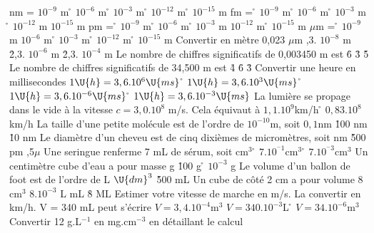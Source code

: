  nm =
\rv
$10^{-9}$ m
\r
$10^{-6}$ m
\r
$10^{-3}$ m
\r
$10^{-12}$ m
\r
$10^{-15}$ m
 fm =
\r
$10^{-9}$ m
\r
$10^{-6}$ m
\r
$10^{-3}$ m
\r
$10^{-12}$ m
\rv
$10^{-15}$ m
 pm =
\r
$10^{-9}$ m
\r
$10^{-6}$ m
\r
$10^{-3}$ m
\rv
$10^{-12}$ m
\r
$10^{-15}$ m
 $\mu$m =
\r
$10^{-9}$ m
\rv
$10^{-6}$ m
\r
$10^{-3}$ m
\r
$10^{-12}$ m
\r
$10^{-15}$ m
\q
Convertir en mètre 0,023 $\mu$m
,3. $10^{-8}$ m
\r
2,3. $10^{-6}$ m
\r
2,3. $10^{-4}$ m
\q
Le nombre de chiffres significatifs de 0,003450 m est
\r
6
\r
3
\r
5
\q
Le nombre de chiffres significatifs de 34,500 m est
\r
4
\r
6
\r
3
\q
Convertir une heure en millisecondes
\rv
$1 \U{h} = 3,6.10^6 \U{ms}$
\r
$1 \U{h} = 3,6.10^3 \U{ms}$
\r
$1 \U{h} = 3,6.10^{-6} \U{ms}$
\r
$1 \U{h} = 3,6.10^{-3} \U{ms}$
\q
La lumière se propage dans le vide à  la vitesse $c=3,0.10^8$ m/s.
Cela équivaut à  
\rv
$1,1.10^9$km/h
\r
$0,83.10^8$km/h
\q
La taille d'une petite molécule	est de l'ordre de $10^{-10}$m, soit
\rv
$0,1$nm
\r
100 nm
\r
10 nm	
\q
Le diamètre d'un cheveu	est de cinq dixièmes de micromètres, soit
 nm
\r
500 pm
,5$\mu$
\q 
Une seringue renferme 7 mL de sérum, soit
 cm$^{3}$
\r
$7.10^{^-1}$cm$^{3}$
\r
$7.10^{^-3}$cm$^{3}$
\q
Un centimètre cube d'eau a pour masse
 g
\r
100 g
\r
$10^{-3}$ g
\q
Le volume d'un ballon de foot est de l'ordre de 
 L
 $\U{dm}^{3}$
\r
500 mL
\q
Un cube de côté 2 cm a pour volume
\rv
$8$ cm$^{3}$
\rv
$8.10^{-3}$ L 
 mL
\r
8 ML
\q
Estimer votre vitesse de marche en m/s. La convertir en km/h.
\q
 V = 340 mL peut s'écrire
\rv
$V =3,4.10^{-4}$m$^{3}$
\rv 
$V = 340.10^{-3}$L
\r
$V=34.10^{-6}$m$^{3}$
\q Convertir 12 g.L$^{-1}$ en mg.cm$^{-3}$ en détaillant le calcul


